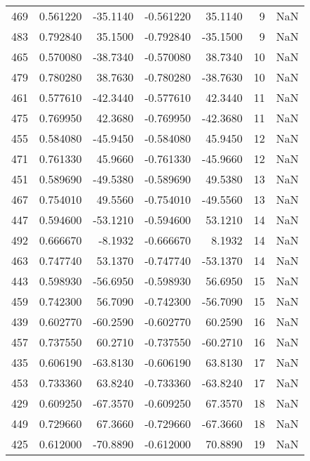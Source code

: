 \begin{tabular}{rrrrrrr}
 469 &    0.561220 &  -35.1140 &   -0.561220 &     35.1140 &           9 & NaN \\
 483 &    0.792840 &   35.1500 &   -0.792840 &    -35.1500 &           9 & NaN \\
 465 &    0.570080 &  -38.7340 &   -0.570080 &     38.7340 &          10 & NaN \\
 479 &    0.780280 &   38.7630 &   -0.780280 &    -38.7630 &          10 & NaN \\
 461 &    0.577610 &  -42.3440 &   -0.577610 &     42.3440 &          11 & NaN \\
 475 &    0.769950 &   42.3680 &   -0.769950 &    -42.3680 &          11 & NaN \\
 455 &    0.584080 &  -45.9450 &   -0.584080 &     45.9450 &          12 & NaN \\
 471 &    0.761330 &   45.9660 &   -0.761330 &    -45.9660 &          12 & NaN \\
 451 &    0.589690 &  -49.5380 &   -0.589690 &     49.5380 &          13 & NaN \\
 467 &    0.754010 &   49.5560 &   -0.754010 &    -49.5560 &          13 & NaN \\
 447 &    0.594600 &  -53.1210 &   -0.594600 &     53.1210 &          14 & NaN \\
 492 &    0.666670 &   -8.1932 &   -0.666670 &      8.1932 &          14 & NaN \\
 463 &    0.747740 &   53.1370 &   -0.747740 &    -53.1370 &          14 & NaN \\
 443 &    0.598930 &  -56.6950 &   -0.598930 &     56.6950 &          15 & NaN \\
 459 &    0.742300 &   56.7090 &   -0.742300 &    -56.7090 &          15 & NaN \\
 439 &    0.602770 &  -60.2590 &   -0.602770 &     60.2590 &          16 & NaN \\
 457 &    0.737550 &   60.2710 &   -0.737550 &    -60.2710 &          16 & NaN \\
 435 &    0.606190 &  -63.8130 &   -0.606190 &     63.8130 &          17 & NaN \\
 453 &    0.733360 &   63.8240 &   -0.733360 &    -63.8240 &          17 & NaN \\
 429 &    0.609250 &  -67.3570 &   -0.609250 &     67.3570 &          18 & NaN \\
 449 &    0.729660 &   67.3660 &   -0.729660 &    -67.3660 &          18 & NaN \\
 425 &    0.612000 &  -70.8890 &   -0.612000 &     70.8890 &          19 & NaN \\

\end{tabular}

